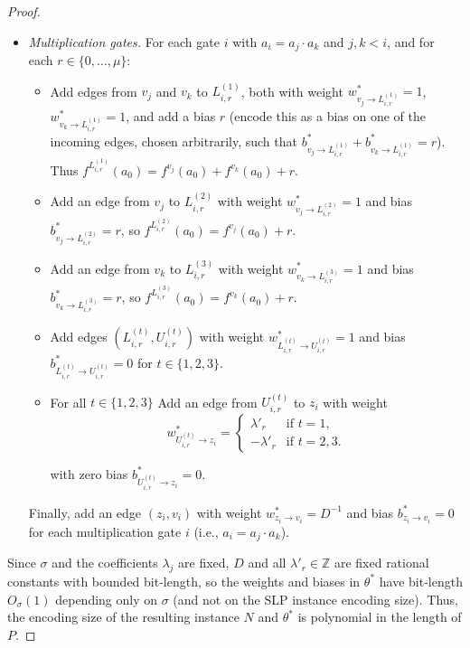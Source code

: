 \documentclass{article}
\theoremstyle{plain}
\theoremstyle{definition}
\theoremstyle{remark}
\begin{document}
\begin{proof}
\begin{itemize}
		\item \emph{Multiplication gates.}
		For each gate $i$ with $a_i = a_j \cdot a_k$ and $j,k<i$, and for
		each $r\in\{0,\dots,{\mu}\}$:
		\begin{itemize}
			\item Add edges from $v_j$ and $v_k$ to $L^{(1)}_{i,r}$, both
			with weight $w^\ast_{v_j \to L^{(1)}_{i,r}} = 1$, $w^\ast_{v_k \to L^{(1)}_{i,r}} = 1$, and add a bias $r$ (encode this
			as a bias on one of the incoming edges, chosen
			arbitrarily, such that $b^\ast_{v_j \to L^{(1)}_{i,r}} + b^\ast_{v_k \to L^{(1)}_{i,r}} = r$). Thus
			$f^{L^{(1)}_{i,r}}(a_0)=f^{v_j}(a_0)+f^{v_k}(a_0)+r$.
			\item Add an edge from $v_j$ to $L^{(2)}_{i,r}$ with weight $w^\ast_{v_j \to L^{(2)}_{i,r}}=1$
			and bias $b^\ast_{v_j \to L^{(2)}_{i,r}} = r$, so $f^{L^{(2)}_{i,r}}(a_0)=f^{v_j}(a_0)+r$.
			\item Add an edge from $v_k$ to $L^{(3)}_{i,r}$ with weight $w^\ast_{v_k \to L^{(3)}_{i,r}} = 1$
			and bias $b^\ast_{v_k \to L^{(3)}_{i,r}} = r$, so $f^{L^{(3)}_{i,r}}(a_0)=f^{v_k}(a_0)+r$.
			\item Add edges $\left(L^{(t)}_{i,r},U^{(t)}_{i,r}\right)$ with
			weight $w^\ast_{L^{(t)}_{i,r} \to U^{(t)}_{i,r}} = 1$ and bias $b^\ast_{L^{(t)}_{i,r} \to U^{(t)}_{i,r}} =0$ for $t\in\{1,2,3\}$.
			\item For all $t \in \{1,2,3\}$ Add an edge from $U^{(t)}_{i,r}$
			to $z_i$ with weight 
            \[
w^\ast_{U^{(t)}_{i,r} \to z_i} =
\begin{cases}
\lambda'_r & \text{if } t=1,\\
-\lambda'_r & \text{if } t=2,3.
\end{cases}
\]
            
			 with zero bias $b^\ast_{U^{(t)}_{i,r} \to z_i} = 0$.
		\end{itemize}
		Finally, add an edge $(z_i,v_i)$ with weight $w^\ast_{z_i \to v_i} = D^{-1}$ and bias
		$b^\ast_{z_i \to v_i} = 0$ for each multiplication gate $i$ (i.e., $a_i = a_j \cdot a_k$).
	\end{itemize}
	
	Since $\sigma$ and the coefficients $\lambda_j$ are fixed, $D$ and all
	$\lambda'_r\in\mathbb{Z}$ are fixed rational constants with bounded bit-length,
	so the weights and biases in $\theta^\ast$ have
	bit-length $O_\sigma(1)$ depending only on $\sigma$ (and not on the SLP
	instance encoding size). Thus, the encoding size of the resulting instance
	$N$ and $\theta^\ast$ is polynomial in the length of $P$.
	

\end{proof}
\end{document}
